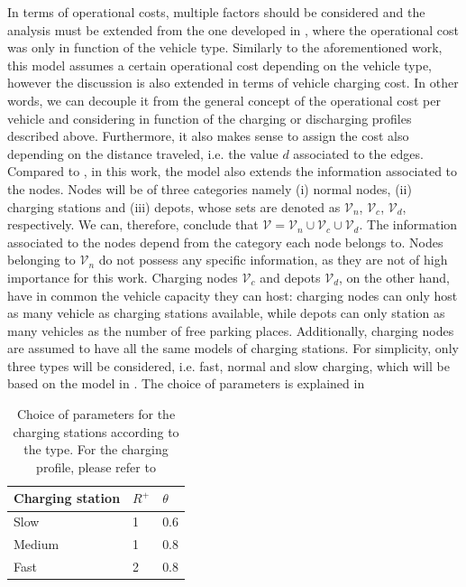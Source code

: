 In terms of operational costs, multiple factors should be considered and the analysis must be extended from the one developed in \cite{project_thesis}, where the operational cost was only in function of the vehicle type. Similarly to the aforementioned work, this model assumes a certain operational cost depending on the vehicle type, however the discussion is also extended in terms of vehicle charging cost. In other words, we can decouple it from the general concept of the operational cost per vehicle and considering in function of the charging or discharging profiles described above. Furthermore, it also makes sense to assign the cost also depending on the distance traveled, i.e. the value $d$ associated to the edges. \\
Compared to \cite{project_thesis}, in this work, the model also extends the information associated to the nodes. Nodes will be of three categories namely \textup{(i)} normal nodes, \textup{(ii)} charging stations and \textup{(iii)} depots, whose sets are denoted as $\mathcal{V}_n$, $\mathcal{V}_c$, $\mathcal{V}_d$, respectively. We can, therefore, conclude that $\mathcal{V} = \mathcal{V}_n \cup \mathcal{V}_c \cup \mathcal{V}_d $. The information associated to the nodes depend from the category each node belongs to. Nodes belonging to $\mathcal{V}_n$ do not possess any specific information, as they are not of high importance for this work. Charging nodes $\mathcal{V}_c$ and depots $\mathcal{V}_d$, on the other hand, have in common the vehicle capacity they can host: charging nodes can only host as many vehicle as charging stations available, while depots can only station as many vehicles as the number of free parking places. Additionally, charging nodes are assumed to have all the same models of charging stations. For simplicity, only three types will be considered, i.e. fast, normal and slow charging, which will be based on the model in . The choice of parameters is explained in 	
\begin{table}[th]
	\centering
\begin{tabular}{ |p{3cm}|p{3cm}|p{3cm}|  }
	\hline
	Charging station& $R^+$&$\theta$ \\
	\hline
	Slow & 1 &0.6 \\
	Medium & 1   & 0.8 \\
	Fast &2 & 0.8 \\
	\hline
\end{tabular}
	\caption[Parameters choice for the Chargin Stations]{Choice of parameters for the charging stations according to the type. For the charging profile, please refer to }
	\label{tab:charging_stations}	
\end{table}\\


